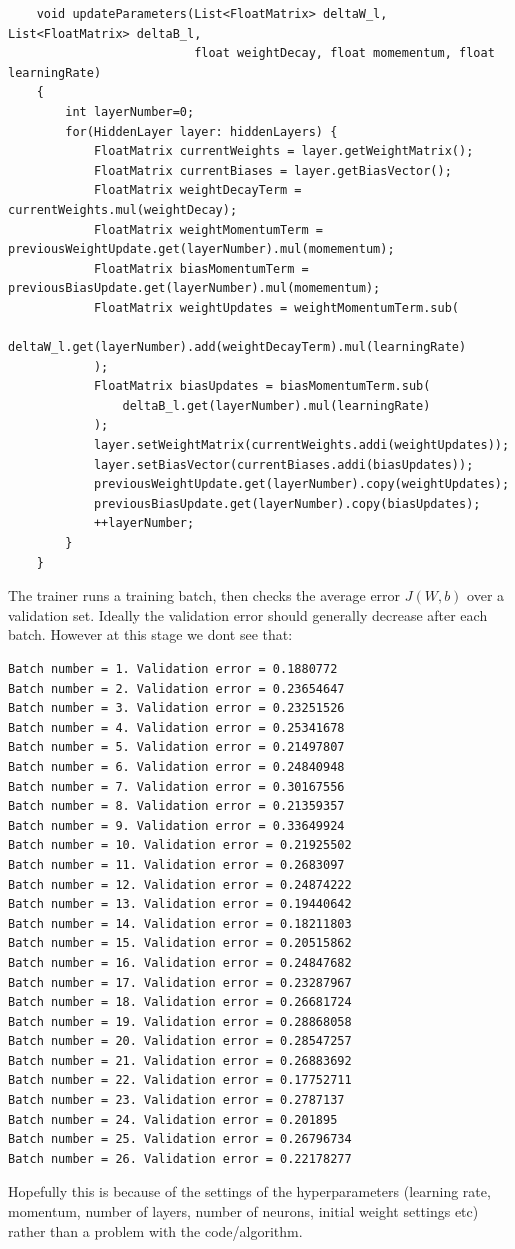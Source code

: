 \documentclass[11pt]{article} %
\begin{document}
\begin{lstlisting}
    void updateParameters(List<FloatMatrix> deltaW_l, List<FloatMatrix> deltaB_l,
                          float weightDecay, float momementum, float learningRate)
    {
        int layerNumber=0;
        for(HiddenLayer layer: hiddenLayers) {
            FloatMatrix currentWeights = layer.getWeightMatrix();
            FloatMatrix currentBiases = layer.getBiasVector();
            FloatMatrix weightDecayTerm = currentWeights.mul(weightDecay);
            FloatMatrix weightMomentumTerm = previousWeightUpdate.get(layerNumber).mul(momementum);
            FloatMatrix biasMomentumTerm = previousBiasUpdate.get(layerNumber).mul(momementum);
            FloatMatrix weightUpdates = weightMomentumTerm.sub(
                deltaW_l.get(layerNumber).add(weightDecayTerm).mul(learningRate)
            );
            FloatMatrix biasUpdates = biasMomentumTerm.sub(
                deltaB_l.get(layerNumber).mul(learningRate)
            );
            layer.setWeightMatrix(currentWeights.addi(weightUpdates));
            layer.setBiasVector(currentBiases.addi(biasUpdates));
            previousWeightUpdate.get(layerNumber).copy(weightUpdates);
            previousBiasUpdate.get(layerNumber).copy(biasUpdates);
            ++layerNumber;
        }
    }
\end{lstlisting}


The trainer runs a training batch, then checks the average error $J(W,b)$ over a validation set. Ideally the validation error should generally decrease after each batch. However at this stage we dont see that:
\begin{lstlisting}
Batch number = 1. Validation error = 0.1880772
Batch number = 2. Validation error = 0.23654647
Batch number = 3. Validation error = 0.23251526
Batch number = 4. Validation error = 0.25341678
Batch number = 5. Validation error = 0.21497807
Batch number = 6. Validation error = 0.24840948
Batch number = 7. Validation error = 0.30167556
Batch number = 8. Validation error = 0.21359357
Batch number = 9. Validation error = 0.33649924
Batch number = 10. Validation error = 0.21925502
Batch number = 11. Validation error = 0.2683097
Batch number = 12. Validation error = 0.24874222
Batch number = 13. Validation error = 0.19440642
Batch number = 14. Validation error = 0.18211803
Batch number = 15. Validation error = 0.20515862
Batch number = 16. Validation error = 0.24847682
Batch number = 17. Validation error = 0.23287967
Batch number = 18. Validation error = 0.26681724
Batch number = 19. Validation error = 0.28868058
Batch number = 20. Validation error = 0.28547257
Batch number = 21. Validation error = 0.26883692
Batch number = 22. Validation error = 0.17752711
Batch number = 23. Validation error = 0.2787137
Batch number = 24. Validation error = 0.201895
Batch number = 25. Validation error = 0.26796734
Batch number = 26. Validation error = 0.22178277
\end{lstlisting}
Hopefully this is because of the settings of the hyperparameters (learning rate, momentum, number of layers, number of neurons, initial weight settings etc) rather than a problem with the code/algorithm.
\end{document}
